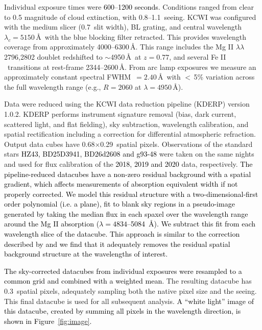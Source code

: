 \documentclass[twocolumn]{aastex62}
\newcommand{\MgII}{Mg\tiny{ }\footnotesize{II}\normalsize{ }}
\newcommand{\FeII}{Fe\tiny{ }\footnotesize{II}\normalsize{ }}
\newcommand{\comment}[1]{\textcolor{black}{#1}}
\begin{document}
Individual exposure times were \comment{600--1200 seconds}. Conditions ranged from clear to 0.5 magnitude of cloud extinction, with 0.8\arcsec--1.1\arcsec~seeing. KCWI was configured with the medium slicer (0.7\arcsec~slit width), BL grating, and central wavelength $\lambda_c=5150$\,\AA\ with the blue blocking filter retracted. This provides wavelength coverage from approximately 4000--6300\,\AA. This range includes the \MgII$\lambda\lambda$2796,2802 doublet redshifted to $\sim$4950\,\AA\ at $z=0.77$, and several \FeII\ transitions at rest-frame 2344--2600\,\AA. From arc lamp exposures we measure an approximately constant spectral FWHM~$=2.40$\,\AA\ with $<$\,5\% variation across the full wavelength range (e.g., $R=2060$ at $\lambda=4950$\,\AA). 

Data were reduced using the KCWI data reduction pipeline (KDERP) version 1.0.2. KDERP performs instrument signature removal (bias, dark current, scattered light, and flat fielding), sky subtraction, wavelength calibration, and spatial rectification including a correction for differential atmospheric refraction. Output data cubes have 0.68\arcsec$\times$0.29\arcsec~spatial pixels. 
Observations of the standard stars \comment{HZ43, BD25D3941, BD26d2608 and g93-48} were taken on the same nights and used for flux calibration of the \comment{2018, 2019 and 2020} data, respectively. \comment{The pipeline-reduced datacubes have a non-zero residual background with a spatial gradient, which affects measurements of absorption equivalent width if not properly corrected. We model this residual structure with a two-dimensional-first order polynomial (i.e. a plane), fit to blank sky regions in a pseudo-image generated by taking the median flux in each spaxel over the wavelength range around the \MgII absorption ($\lambda = 4834$--5084~\AA). We subtract this fit from each wavelength slice of the datacube. This approach is similar to the correction described by \cite{Burchett2020} and we find that it adequately removes the residual spatial background structure at the wavelengths of interest. 
}


\comment{ The sky-corrected datacubes from individual exposures were resampled to a common grid and combined with a weighted mean.} The resulting datacube has 0.3\arcsec~spatial pixels, adequately sampling both the native pixel size and the seeing. This final datacube is used for all subsequent analysis. 
\comment{A ``white light'' image of this datacube, created by summing all pixels in the wavelength direction, is shown in Figure~\ref{fig:image}.}
\end{document}

